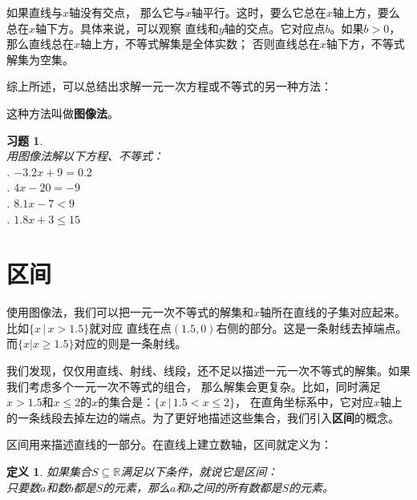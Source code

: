 \documentclass[12pt,UTF8]{ctexbook}
\newtheorem{df}{定义}[section]
\newtheorem{xt}{习题}[section]
\begin{document}
如果直线与$x$轴没有交点，
那么它与$x$轴平行。这时，要么它总在$x$轴上方，要么总在$x$轴下方。具体来说，可以观察
直线和$y$轴的交点。它对应点$b$。如果$b>0$，那么直线总在$x$轴上方，不等式解集是全体实数；
否则直线总在$x$轴下方，不等式解集为空集。

综上所述，可以总结出求解一元一次方程或不等式的另一种方法：
\begin{center}
\end{center}

这种方法叫做\textbf{图像法}。

\begin{xt}\label{xt:5-3-0}
    \mbox{}\\
    用图像法解以下方程、不等式：\\
    . $-3.2x + 9 = 0.2$\\
    . $4x - 20 = -9$\\
    . $8.1x -7 < 9$\\
    . $1.8x + 3 \leqslant 15$
\end{xt}

\section{区间}
使用图像法，我们可以把一元一次不等式的解集和$x$轴所在直线的子集对应起来。比如$\{x \, | \, x > 1.5\}$就对应
直线在点$(1.5, 0)$右侧的部分。这是一条射线去掉端点。而$\{x | x \geqslant 1.5\}$对应的则是一条射线。

我们发现，仅仅用直线、射线、线段，还不足以描述一元一次不等式的解集。如果我们考虑多个一元一次不等式的组合，
那么解集会更复杂。比如，同时满足$x > 1.5$和$x \leqslant 2$的$x$的集合是：$\{x \, | \, 1.5 < x \leqslant 2\}$，
在直角坐标系中，它对应$x$轴上的一条线段去掉左边的端点。为了更好地描述这些集合，我们引入\textbf{区间}的概念。

区间用来描述直线的一部分。在直线上建立数轴，区间就定义为：

\begin{df}\label{df:5-3-0}
    如果集合$S\subseteq \mathbb{R}$满足以下条件，就说它是区间：\\
    只要数$a$和数$b$都是$S$的元素，那么$a$和$b$之间的所有数都是$S$的元素。
\end{df}
\end{document}
